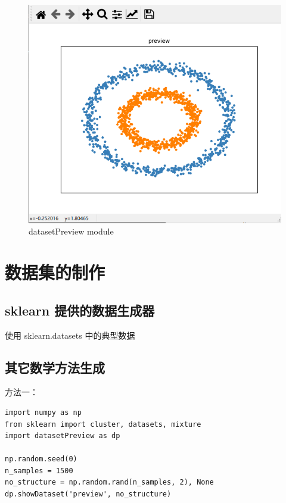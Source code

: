 \documentclass[UTF8]{ctexart}
\begin{document}
\begin{figure}[ht]
\centering
\includegraphics[scale=0.5]{dp.png}
\caption{datasetPreview module}
\end{figure}


\section{数据集的制作}
\subsection{sklearn 提供的数据生成器}
使用 sklearn.datasets 中的典型数据

\subsection{其它数学方法生成}
方法一：
\begin{lstlisting}[style=stylePy]
import numpy as np
from sklearn import cluster, datasets, mixture
import datasetPreview as dp

np.random.seed(0)  
n_samples = 1500
no_structure = np.random.rand(n_samples, 2), None
dp.showDataset('preview', no_structure)
\end{lstlisting}
\end{document}
